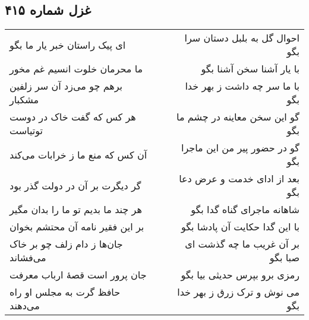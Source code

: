 \begin{center}
\section*{غزل شماره ۴۱۵}
\label{sec:sh415}
\begin{longtable}{l p{0.5cm} r}
ای پیک راستان خبر یار ما بگو
&&
احوال گل به بلبل دستان سرا بگو
\\
ما محرمان خلوت انسیم غم مخور
&&
با یار آشنا سخن آشنا بگو
\\
برهم چو می‌زد آن سر زلفین مشکبار
&&
با ما سر چه داشت ز بهر خدا بگو
\\
هر کس که گفت خاک در دوست توتیاست
&&
گو این سخن معاینه در چشم ما بگو
\\
آن کس که منع ما ز خرابات می‌کند
&&
گو در حضور پیر من این ماجرا بگو
\\
گر دیگرت بر آن در دولت گذر بود
&&
بعد از ادای خدمت و عرض دعا بگو
\\
هر چند ما بدیم تو ما را بدان مگیر
&&
شاهانه ماجرای گناه گدا بگو
\\
بر این فقیر نامه آن محتشم بخوان
&&
با این گدا حکایت آن پادشا بگو
\\
جان‌ها ز دام زلف چو بر خاک می‌فشاند
&&
بر آن غریب ما چه گذشت ای صبا بگو
\\
جان پرور است قصهٔ ارباب معرفت
&&
رمزی برو بپرس حدیثی بیا بگو
\\
حافظ گرت به مجلس او راه می‌دهند
&&
می نوش و ترک زرق ز بهر خدا بگو
\\
\end{longtable}
\end{center}
